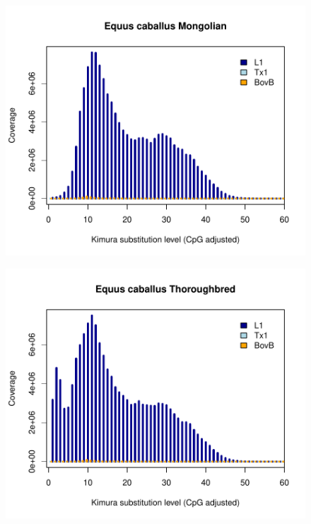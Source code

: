 \documentclass[12pt,a4paper,times]{article}
\begin{document}
\begin{figure}[H]
	\centering
	\includegraphics[scale=0.8]{suppFigures/divergencePlots/Equus_caballus_Mongolian.pdf}
	\caption{\label{Equus_caballus_Mongolian}}
\end{figure}

\begin{figure}[H]
	\centering
	\includegraphics[scale=0.8]{suppFigures/divergencePlots/Equus_caballus_Thoroughbred.pdf}
	\caption{\label{Equus_caballus_Thoroughbred}}
\end{figure}
\end{document}

